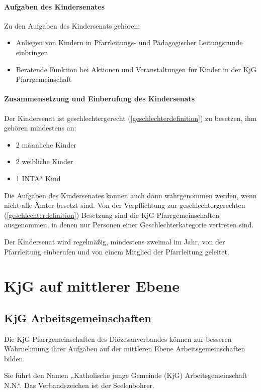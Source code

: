 \documentclass[12pt]{report}
\begin{document}
\begin{justify}
\subsubsection{Aufgaben des Kindersenates}
Zu den Aufgaben des Kindersenats gehören:
\begin{itemize}
  \item Anliegen von Kindern in Pfarrleitungs- und Pädagogischer Leitungsrunde einbringen
  \item Beratende Funktion bei Aktionen und Veranstaltungen für Kinder in der KjG Pfarrgemeinschaft
\end{itemize}

\subsubsection{Zusammensetzung und Einberufung des Kindersenats}

Der Kindersenat ist geschlechtergerecht (\ref{geschlechterdefinition}) zu besetzen,
ihm gehören mindestens an:

\begin{itemize}
  \item 2 männliche Kinder
  \item 2 weibliche Kinder
  \item 1 INTA* Kind
\end{itemize}
Die Aufgaben des Kindersenates können auch dann wahrgenommen werden, wenn nicht alle Ämter besetzt sind.
Von der Verpflichtung zur geschlechtergerechten (\ref{geschlechterdefinition}) Besetzung sind die KjG Pfarrgemeinschaften ausgenommen,
in denen nur Personen einer Geschlechterkategorie vertreten sind.

Der Kindersenat wird regelmäßig, mindestens zweimal im Jahr, von der Pfarrleitung einberufen
und von einem Mitglied der Pfarrleitung geleitet.

\chapter{KjG auf mittlerer Ebene}

\section{KjG Arbeitsgemeinschaften}

Die KjG Pfarrgemeinschaften des Diözesanverbandes können zur besseren Wahrnehmung ihrer
Aufgaben auf der mittleren Ebene Arbeitsgemeinschaften bilden.

Sie führt den Namen „Katholische junge Gemeinde (KjG) Arbeitsgemeinschaft N.N.“.
Das Verbandszeichen ist der Seelenbohrer.


\end{justify}
\end{document}
